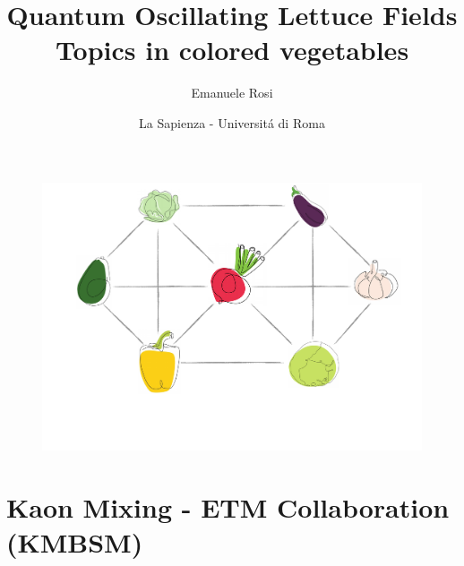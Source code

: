 \documentclass[12pt,a4paper,openright]{article}
\begin{document}
\title{
  \vskip 3cm
  {\bf \textcolor{PineGreen}{Quantum Oscillating Lettuce Fields}} \\ \textcolor{PineGreen}{Topics in colored vegetables}
}
\author{Emanuele Rosi}
\date{La Sapienza - Universit\'a di Roma}

\begin{figure}[!b]
  \centering
  \includegraphics*[width=\textwidth]{ottetto.pdf}
  \vspace*{5mm}
\end{figure}

\maketitle

\newpage

\tableofcontents

\newpage

\section{Kaon Mixing - ETM Collaboration (KMBSM)}
\end{document}
